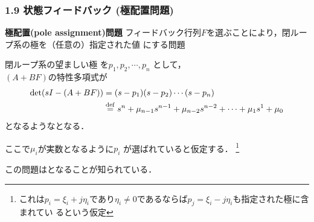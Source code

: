 \begin{frame}[t]
\frametitle{1.9 状態フィードバック (極配置問題)}
\begin{block}{\bf 極配置(pole assignment)問題}
フィードバック行列$F$を選ぶことにより，閉ループ系の極を（任意の）指定された値
にする問題
\end{block}

閉ループ系の望ましい極
を$p_1, p_2, \cdots, p_n$ として，\\
$(A + B F)$の特性多項式が
\begin{align}
 \mathop{\rm det}\nolimits (s I - (A + B F))
 &= (s - p_1)(s - p_2) \cdots (s - p_n) \nonumber \\
 &\stackrel{\rm def}{=} s^n + \mu_{n-1} s^{n-1} + \mu_{n-2} s^{n-2}
  + \cdots + \mu_1 s^1 + \mu_0
\end{align}
となるようなとなる．

\vspace{5mm}

ここで$\mu_i$が実数となるように$p_i$
が選ばれていると仮定する．
\footnote{これは$p_i = \xi_i + j \eta_i $であり$\eta_i
\neq 0$であるならば$p_j = \xi_i - j \eta_i$も指定された極に含まれてい
るという仮定}

この問題は\underline{}となることが知られている．

\end{frame}


